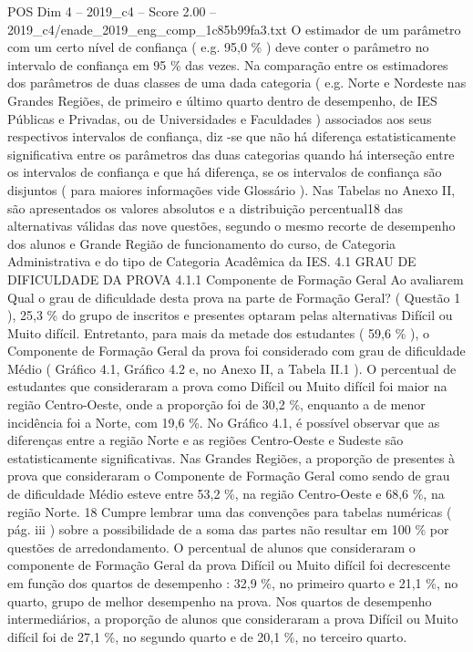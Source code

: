 \begin{textsample}{POS Dim 4 – 2019\_c4 – Score 2.00 – 2019\_c4/enade\_2019\_eng\_comp\_1c85b99fa3.txt}
O estimador de um parâmetro com um certo nível de confiança ( e.g. 95,0 \% ) deve conter o parâmetro no intervalo de confiança em 95 \% das vezes.
Na comparação entre os estimadores dos parâmetros de duas classes de uma dada categoria ( e.g.
Norte e Nordeste nas Grandes Regiões, de primeiro e último quarto dentro de desempenho, de IES Públicas e Privadas, ou de Universidades e Faculdades ) associados aos seus respectivos intervalos de confiança, diz -se que não há diferença estatisticamente significativa entre os parâmetros das duas categorias quando há interseção entre os intervalos de confiança e que há diferença, se os intervalos de confiança são disjuntos ( para maiores informações vide Glossário ).
Nas Tabelas no Anexo II, são apresentados os valores absolutos e a distribuição percentual18 das alternativas válidas das nove questões, segundo o mesmo recorte de desempenho dos alunos e Grande Região de funcionamento do curso, de Categoria Administrativa e do tipo de Categoria Acadêmica da IES. 4.1 GRAU DE DIFICULDADE DA PROVA 4.1.1 Componente de Formação Geral Ao avaliarem Qual o grau de dificuldade desta prova na parte de Formação Geral? ( Questão 1 ), 25,3 \% do grupo de inscritos e presentes optaram pelas alternativas Difícil ou Muito difícil.
Entretanto, para mais da metade dos estudantes ( 59,6 \% ), o Componente de Formação Geral da prova foi considerado com grau de dificuldade Médio ( Gráfico 4.1, Gráfico 4.2 e, no Anexo II, a Tabela II.1 ).
O percentual de estudantes que consideraram a prova como Difícil ou Muito difícil foi maior na região Centro-Oeste, onde a proporção foi de 30,2 \%, enquanto a de menor incidência foi a Norte, com 19,6 \%.
No Gráfico 4.1, é possível observar que as diferenças entre a região Norte e as regiões Centro-Oeste e Sudeste são estatisticamente significativas.
Nas Grandes Regiões, a proporção de presentes à prova que consideraram o Componente de Formação Geral como sendo de grau de dificuldade Médio esteve entre 53,2 \%, na região Centro-Oeste e 68,6 \%, na região Norte. 18 Cumpre lembrar uma das convenções para tabelas numéricas ( pág. iii ) sobre a possibilidade de a soma das partes não resultar em 100 \% por questões de arredondamento.
O percentual de alunos que consideraram o componente de Formação Geral da prova Difícil ou Muito difícil foi decrescente em função dos quartos de desempenho : 32,9 \%, no primeiro quarto e 21,1 \%, no quarto, grupo de melhor desempenho na prova.
Nos quartos de desempenho intermediários, a proporção de alunos que consideraram a prova Difícil ou Muito difícil foi de 27,1 \%, no segundo quarto e de 20,1 \%, no terceiro quarto.

\end{textsample}
